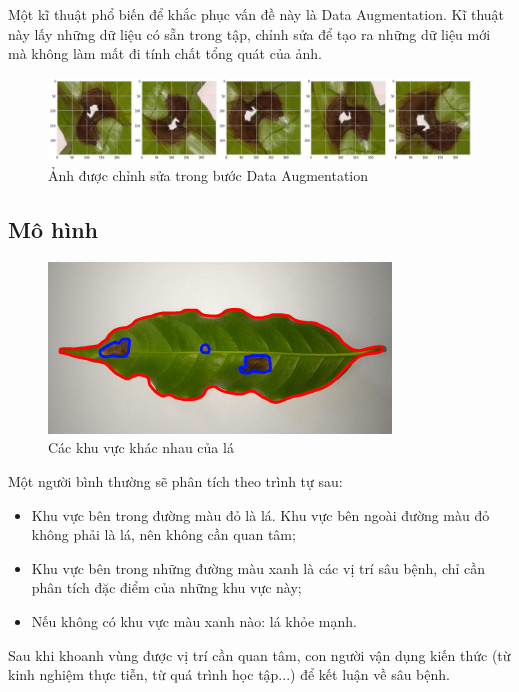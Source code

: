\documentclass[a4paper,14pt]{extarticle}
\begin{document}
	Một kĩ thuật phổ biến để khắc phục vấn đề này là Data Augmentation. Kĩ thuật này lấy những dữ liệu có sẵn trong tập, chỉnh sửa để tạo ra những dữ liệu mới mà không làm mất đi tính chất tổng quát của ảnh.

	\begin{figure}[H]
		\centering
		\includegraphics[scale=0.25]{images/image2}
		\caption{Ảnh được chỉnh sửa trong bước Data Augmentation}
	\end{figure}

	\subsection{Mô hình}
	\begin{figure}[H]
		\centering
		\includegraphics[scale=1]{images/image11}
		\caption{Các khu vực khác nhau của lá}
	\end{figure}

	Một người bình thường sẽ phân tích theo trình tự sau:

	\begin{itemize}
		\item Khu vực bên trong đường màu đỏ là lá. Khu vực bên ngoài
		đường màu đỏ không phải là lá, nên không cần quan tâm;
		\item Khu vực bên trong những đường màu xanh là các vị trí sâu
		bệnh, chỉ cần phân tích đặc điểm của những khu vực này;
		\item Nếu không có khu vực màu xanh nào: lá khỏe mạnh.
	\end{itemize}

	\null

	Sau khi khoanh vùng được vị trí cần quan tâm, con người vận dụng kiến thức (từ kinh nghiệm thực tiễn, từ quá trình học tập...) để kết luận về sâu bệnh.
\end{document}
